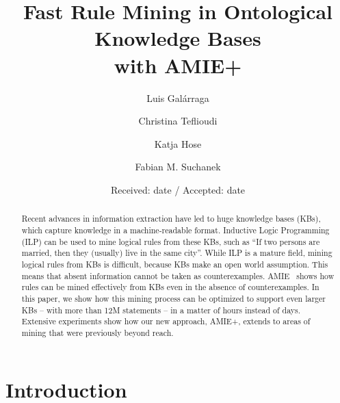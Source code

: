 \documentclass[twocolumn]{svjour3}          %
\begin{document}

\title{Fast Rule Mining in Ontological Knowledge Bases\\ with AMIE+}


\author{Luis Gal\'arraga\and
        Christina Teflioudi \and Katja Hose \and Fabian M. Suchanek
}


\date{Received: date / Accepted: date}

\maketitle

\begin{abstract}
Recent advances in information extraction have led to huge knowledge bases (KBs), which capture knowledge in a ma\-chine-readable format.
Inductive Logic Programming (ILP) can be used to mine logical rules from these KBs, such as ``If two persons are married, then they (usually) live in the same city''.
While ILP is a mature field, mining logical rules from KBs is difficult, because KBs make an open world assumption.
This means that absent information cannot be taken as counterexamples.
AMIE~\cite{amie} shows how rules can be mined effectively from KBs even in the absence of counterexamples.
In this paper, we show how this mining process can be optimized to support even larger KBs -- with more than 12M statements -- in a matter of hours instead of days.
Extensive experiments show how our new approach, AMIE+, extends to areas of mining that were previously beyond reach.
\end{abstract}


\section{Introduction}
\label{sec:introduction}

\end{document}
